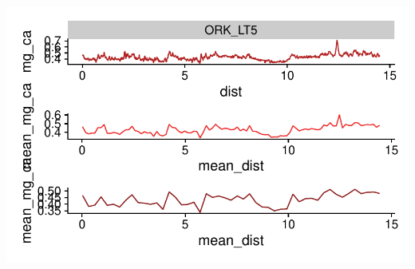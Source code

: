 \documentclass[
  authoryear,
  preprint,
  3p]{elsarticle}
\begin{document}
\includegraphics{Manuscript_files/figure-pdf/subsample-1.pdf}


  
\end{document}
